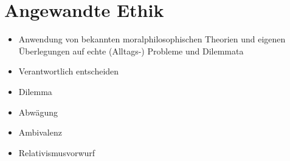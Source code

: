 
\section{Angewandte Ethik}

\begin{itemize}
    \item Anwendung von bekannten moralphilosophischen Theorien und eigenen Überlegungen auf echte (Alltags-) Probleme und Dilemmata
    \item Verantwortlich entscheiden
    \item Dilemma
    \item Abwägung
    \item Ambivalenz
    \item Relativismusvorwurf
\end{itemize}
